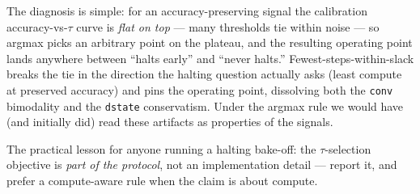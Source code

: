 \documentclass{article}
\newcommand{\sig}[1]{\texttt{#1}}
\begin{document}
The diagnosis is simple: for an accuracy-preserving signal the calibration
accuracy-vs-$\tau$ curve is \emph{flat on top} --- many thresholds tie within
noise --- so argmax picks an arbitrary point on the plateau, and the resulting
operating point lands anywhere between ``halts early'' and ``never halts.''
Fewest-steps-within-slack breaks the tie in the direction the halting question
actually asks (least compute at preserved accuracy) and pins the operating
point, dissolving both the \sig{conv} bimodality and the \sig{dstate}
conservatism. Under the argmax rule we would have (and initially did) read
these artifacts as properties of the signals.

The practical lesson for anyone running a halting bake-off: the
$\tau$-selection objective is \emph{part of the protocol}, not an
implementation detail --- report it, and prefer a compute-aware rule when the
claim is about compute.
\end{document}
